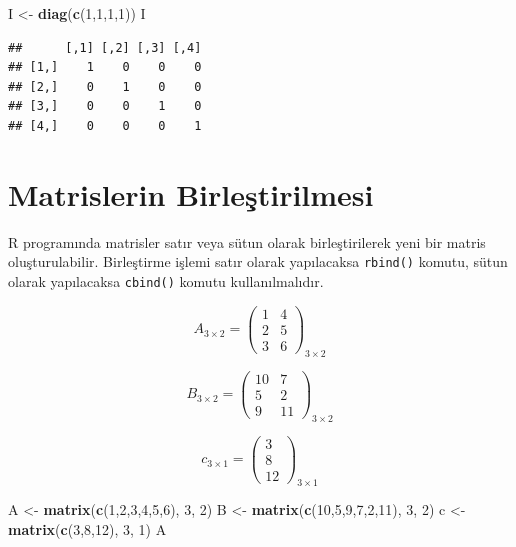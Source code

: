 \documentclass[
]{book}
\newenvironment{Shaded}{\begin{snugshade}}{\end{snugshade}}
\newcommand{\DecValTok}[1]{\textcolor[rgb]{0.00,0.00,0.81}{#1}}
\newcommand{\FunctionTok}[1]{\textcolor[rgb]{0.13,0.29,0.53}{\textbf{#1}}}
\newcommand{\NormalTok}[1]{#1}
\newcommand{\OtherTok}[1]{\textcolor[rgb]{0.56,0.35,0.01}{#1}}
\begin{document}
\begin{Shaded}
\begin{Highlighting}[]
\NormalTok{I }\OtherTok{\textless{}{-}} \FunctionTok{diag}\NormalTok{(}\FunctionTok{c}\NormalTok{(}\DecValTok{1}\NormalTok{,}\DecValTok{1}\NormalTok{,}\DecValTok{1}\NormalTok{,}\DecValTok{1}\NormalTok{)) }
\NormalTok{I }
\end{Highlighting}
\end{Shaded}

\begin{verbatim}
##      [,1] [,2] [,3] [,4]
## [1,]    1    0    0    0
## [2,]    0    1    0    0
## [3,]    0    0    1    0
## [4,]    0    0    0    1
\end{verbatim}

\section{Matrislerin Birleştirilmesi}\label{matrislerin-birleux15ftirilmesi}

R programında matrisler satır veya sütun olarak birleştirilerek yeni bir matris oluşturulabilir. Birleştirme işlemi satır olarak yapılacaksa \texttt{rbind()} komutu, sütun olarak yapılacaksa \texttt{cbind()} komutu kullanılmalıdır.

\[A_{3×2} =
\begin{pmatrix}
 1 & 4 \\
 2 & 5 \\
 3 & 6
\end{pmatrix}_{3×2}\]

\[B_{3×2} =
\begin{pmatrix}
 10 & 7 \\
 5 & 2 \\
 9 & 11
\end{pmatrix}_{3×2}\]

\[c_{3×1} =
\begin{pmatrix}
 3  \\
 8  \\
 12 
\end{pmatrix}_{3×1}\]

\begin{Shaded}
\begin{Highlighting}[]
\NormalTok{ A }\OtherTok{\textless{}{-}} \FunctionTok{matrix}\NormalTok{(}\FunctionTok{c}\NormalTok{(}\DecValTok{1}\NormalTok{,}\DecValTok{2}\NormalTok{,}\DecValTok{3}\NormalTok{,}\DecValTok{4}\NormalTok{,}\DecValTok{5}\NormalTok{,}\DecValTok{6}\NormalTok{), }\DecValTok{3}\NormalTok{, }\DecValTok{2}\NormalTok{)}
\NormalTok{ B }\OtherTok{\textless{}{-}} \FunctionTok{matrix}\NormalTok{(}\FunctionTok{c}\NormalTok{(}\DecValTok{10}\NormalTok{,}\DecValTok{5}\NormalTok{,}\DecValTok{9}\NormalTok{,}\DecValTok{7}\NormalTok{,}\DecValTok{2}\NormalTok{,}\DecValTok{11}\NormalTok{), }\DecValTok{3}\NormalTok{, }\DecValTok{2}\NormalTok{) }
\NormalTok{ c }\OtherTok{\textless{}{-}} \FunctionTok{matrix}\NormalTok{(}\FunctionTok{c}\NormalTok{(}\DecValTok{3}\NormalTok{,}\DecValTok{8}\NormalTok{,}\DecValTok{12}\NormalTok{), }\DecValTok{3}\NormalTok{, }\DecValTok{1}\NormalTok{)}
\NormalTok{ A }
\end{Highlighting}
\end{Shaded}
\end{document}

